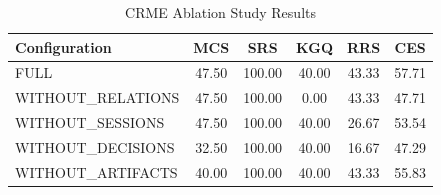 \begin{table}[htbp]
\centering
\caption{CRME Ablation Study Results}
\label{tab:crme-ablation-metrics}
\begin{tabular}{lccccc}
\toprule
Configuration & MCS & SRS & KGQ & RRS & CES \\
\midrule
FULL & 47.50 & 100.00 & 40.00 & 43.33 & 57.71 \\
WITHOUT_RELATIONS & 47.50 & 100.00 & 0.00 & 43.33 & 47.71 \\
WITHOUT_SESSIONS & 47.50 & 100.00 & 40.00 & 26.67 & 53.54 \\
WITHOUT_DECISIONS & 32.50 & 100.00 & 40.00 & 16.67 & 47.29 \\
WITHOUT_ARTIFACTS & 40.00 & 100.00 & 40.00 & 43.33 & 55.83 \\
\bottomrule
\end{tabular}
\end{table}

